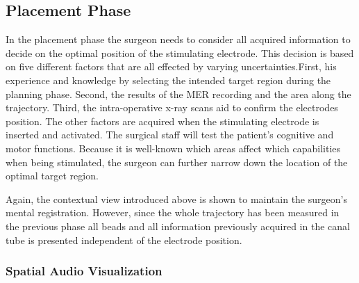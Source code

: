 \documentclass[review]{vgtc}                 %
\begin{document}
\subsection{Placement Phase}\label{sec:overview:placement}
In the placement phase the surgeon needs to consider all acquired information to decide on the optimal position of the stimulating electrode. This decision is based on five different factors that are all effected by varying uncertainties.First, his experience and knowledge by selecting the intended target region during the planning phase. Second, the results of the MER recording and the area along the trajectory. Third, the intra-operative x-ray scans aid to confirm the electrodes position. The other factors are acquired when the stimulating electrode is inserted and activated. The surgical staff will test the patient's cognitive and motor functions. Because it is well-known which areas affect which capabilities when being stimulated, the surgeon can further narrow down the location of the optimal target region.%

Again, the contextual view introduced above is shown to maintain the surgeon's mental registration. However, since the whole trajectory has been measured in the previous phase all beads and all information previously acquired in the canal tube is presented independent of the electrode position. 

\subsubsection{Spatial Audio Visualization}\label{sec:overview:placement:spatialaudio}
\end{document}
